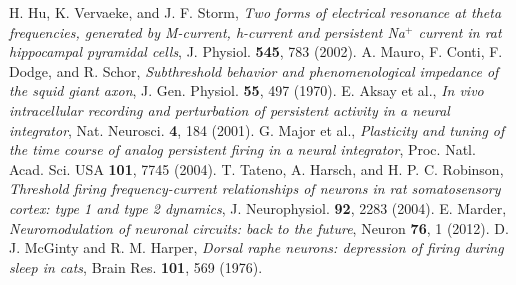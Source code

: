  H. Hu, K. Vervaeke, and J. F. Storm, \emph{Two forms of electrical resonance at theta frequencies, generated by M-current, h-current and persistent Na$^+$ current in rat hippocampal pyramidal cells}, J. Physiol. \textbf{545}, 783 (2002).
 A. Mauro, F. Conti, F. Dodge, and R. Schor, \emph{Subthreshold behavior and phenomenological impedance of the squid giant axon}, J. Gen. Physiol. \textbf{55}, 497 (1970).
 E. Aksay et al., \emph{In vivo intracellular recording and perturbation of persistent activity in a neural integrator}, Nat. Neurosci. \textbf{4}, 184 (2001).
 G. Major et al., \emph{Plasticity and tuning of the time course of analog persistent firing in a neural integrator}, Proc. Natl. Acad. Sci. USA \textbf{101}, 7745 (2004).
 T. Tateno, A. Harsch, and H. P. C. Robinson, \emph{Threshold firing frequency-current relationships of neurons in rat somatosensory cortex: type 1 and type 2 dynamics}, J. Neurophysiol. \textbf{92}, 2283 (2004).
 E. Marder, \emph{Neuromodulation of neuronal circuits: back to the future}, Neuron \textbf{76}, 1 (2012).
 D. J. McGinty and R. M. Harper, \emph{Dorsal raphe neurons: depression of firing during sleep in cats}, Brain Res. \textbf{101}, 569 (1976).
